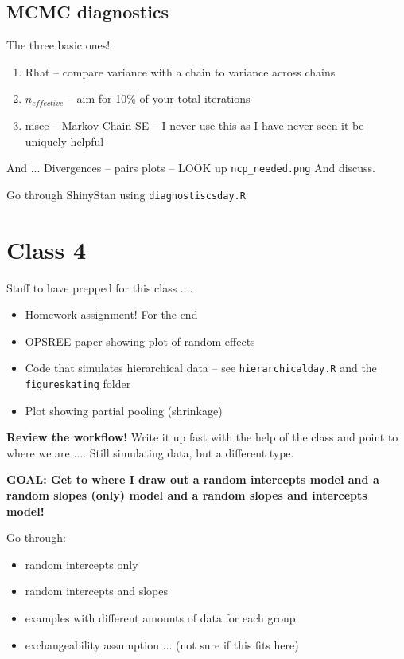 \documentclass[11pt]{article}
\begin{document}
\subsection{MCMC diagnostics}

The three basic ones!
\begin{enumerate}
\item Rhat -- compare variance with a chain to variance across chains
\item $n_{effective}$ -- aim for 10\% of your total iterations 
\item msce -- Markov Chain SE -- I never use this as I have never seen it be uniquely helpful
\end{enumerate}

And ... Divergences -- pairs plots -- LOOK up \verb|ncp_needed.png| And discuss.

Go through ShinyStan using \verb|diagnostiscsday.R| 



\newpage
\section{Class 4} 

Stuff to have prepped for this class .... 
\begin{itemize}
\item Homework assignment! For the end
\item OPSREE paper showing plot of random effects
\item Code that simulates hierarchical data -- see \verb|hierarchicalday.R| and the \verb|figureskating| folder
\item Plot showing partial pooling (shrinkage)
\end{itemize}

{\bf Review the workflow!} Write it up fast with the help of the class and point to where we are .... Still simulating data, but a different type. 


{\bf GOAL: Get to where I draw out a random intercepts model and a random slopes (only) model and a random slopes and intercepts model!}

Go through:
\begin{itemize}
\item random intercepts only
\item random intercepts and slopes
\item examples with different amounts of data for each group
\item exchangeability assumption ... (not sure if this fits here)
\end{itemize}
\end{document}

